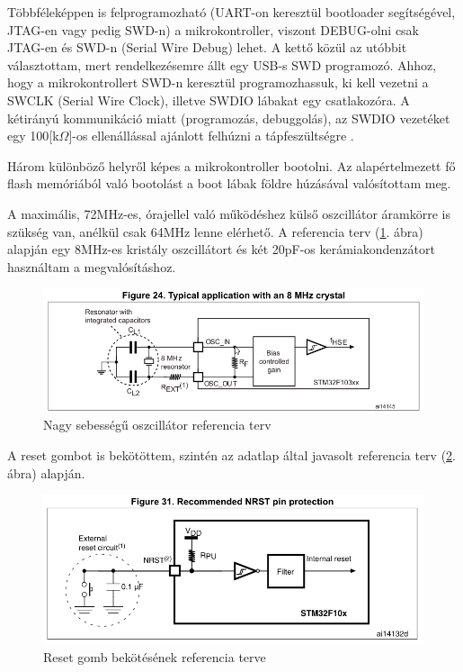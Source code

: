 \documentclass[../main.tex]{subfiles}
\begin{document}
            Többféleképpen is felprogramozható (UART-on keresztül bootloader segítségével, JTAG-en vagy pedig SWD-n) a mikrokontroller, viszont DEBUG-olni csak JTAG-en és SWD-n (Serial Wire Debug) lehet. A kettő közül az utóbbit választottam, mert rendelkezésemre állt egy USB-s SWD programozó. Ahhoz, hogy a mikrokontrollert SWD-n keresztül programozhassuk, ki kell vezetni a SWCLK (Serial Wire Clock), illetve SWDIO lábakat egy csatlakozóra. A kétirányú kommunikáció miatt (programozás, debuggolás), az SWDIO vezetéket egy 100[k$\Omega$]-os ellenállással ajánlott felhúzni a tápfeszültségre \cite{rm0008}. 
            
            Három különböző helyről képes a mikrokontroller bootolni. Az alapértelmezett fő flash memóriából való bootolást a boot lábak földre húzásával valósítottam meg.
            
            A maximális, 72MHz-es, órajellel való működéshez külső oszcillátor áramkörre is szükség van, anélkül csak 64MHz lenne elérhető. A referencia terv (\ref{fig:hse_ref_des}. ábra) alapján egy 8MHz-es kristály oszcillátort és két 20pF-os kerámiakondenzátort használtam a megvalósításhoz. 
            
            \begin{figure}[h!]
                \centering
                    \includegraphics[width=12cm]{resources/pcb_res/hse_ref_des.png}
                \caption{Nagy sebességű oszcillátor referencia terv\cite{ds_stm32}}
                \label{fig:hse_ref_des}
            \end{figure}
            
            A reset gombot is bekötöttem, szintén az adatlap által javasolt referencia terv (\ref{fig:reset_ref_des}. ábra) alapján.
            
            \begin{figure}[h!]
                \centering
                    \includegraphics[width=12cm]{resources/pcb_res/reset_ref_des.png}
                \caption{Reset gomb bekötésének referencia terve\cite{ds_stm32}}
                \label{fig:reset_ref_des}
            \end{figure}
            
\end{document}
